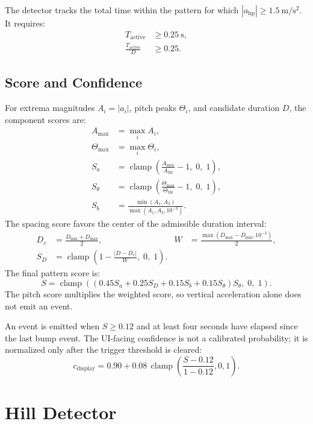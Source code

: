 \documentclass[11pt]{article}
\newcommand{\abs}[1]{\left|#1\right|}
\begin{document}
The detector tracks the total time within the pattern for which
\(\abs{a_{\mathrm{hp}}}\ge1.5~\mathrm{m/s^2}\). It requires:
\begin{align}
  T_{\mathrm{active}} &\ge 0.25~\mathrm{s},\\
  \frac{T_{\mathrm{active}}}{D} &\ge 0.25.
\end{align}

\subsection{Score and Confidence}

For extrema magnitudes \(A_i=\abs{a_i}\), pitch peaks \(\Theta_i\), and
candidate duration \(D\), the component scores are:
\begin{align}
  A_{\max} &= \max_i A_i,\\
  \Theta_{\max} &= \max_i \Theta_i,\\
  S_a &= \operatorname{clamp}\left(\frac{A_{\max}}{A_{\mathrm{thr}}}-1,\;0,\;1\right),\\
  S_\theta &= \operatorname{clamp}\left(\frac{\Theta_{\max}}{\Theta_{\mathrm{thr}}}-1,\;0,\;1\right),\\
  S_b &= \frac{\min(A_1,A_3)}{\max(A_1,A_3,10^{-3})}.
\end{align}
The spacing score favors the center of the admissible duration interval:
\begin{align}
  D_c &= \frac{D_{\min}+D_{\max}}{2},&
  W &= \frac{\max(D_{\max}-D_{\min},10^{-3})}{2},\\
  S_D &= \operatorname{clamp}\left(1-\frac{\abs{D-D_c}}{W},\;0,\;1\right).
\end{align}
The final pattern score is:
\begin{equation}
  S =
  \operatorname{clamp}\left(
    (0.45S_a+0.25S_D+0.15S_b+0.15S_\theta)S_\theta,\;0,\;1
  \right).
\end{equation}
The pitch score multiplies the weighted score, so vertical acceleration alone
does not emit an event.

An event is emitted when \(S\ge0.12\) and at least four seconds have elapsed
since the last bump event. The UI-facing confidence is not a calibrated
probability; it is normalized only after the trigger threshold is cleared:
\begin{equation}
  c_{\mathrm{display}} =
  0.90 + 0.08\,
  \operatorname{clamp}\left(\frac{S-0.12}{1-0.12},0,1\right).
\end{equation}

\section{Hill Detector}
\end{document}
